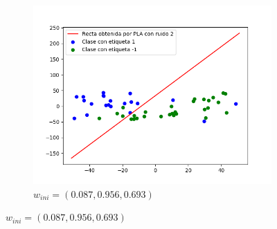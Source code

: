 \documentclass[12pt,a4paper]{article}
\begin{document}
\begin{figure}[H]
	\begin{subfigure}{0.33\textwidth}
		\includegraphics[scale=0.37]{./Imagenes/ej2-15.png}
		\caption{$w_{ini} = (0.087,0.956,0.693)$}
	\end{subfigure}
\end{figure}
\end{document}
